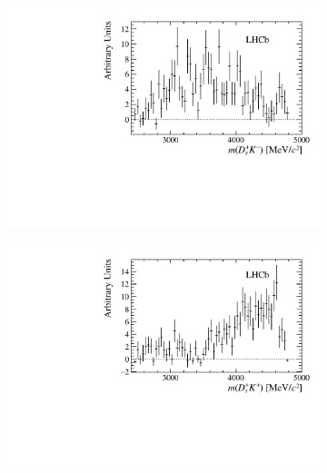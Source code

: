 \begin{figure}[!h]
    \centering
    \begin{subfigure}[t]{0.49\textwidth}
        \includegraphics[width=1.0\textwidth]{figs/B2DsKK/DsKm_mass_sweighted.pdf}
    \end{subfigure}
    \begin{subfigure}[t]{0.49\textwidth}
        \includegraphics[width=1.0\textwidth]{figs/B2DsKK/DsKp_mass_sweighted.pdf}
    \end{subfigure}
    \begin{subfigure}[t]{0.49\textwidth}

\end{subfigure}
\end{figure}
